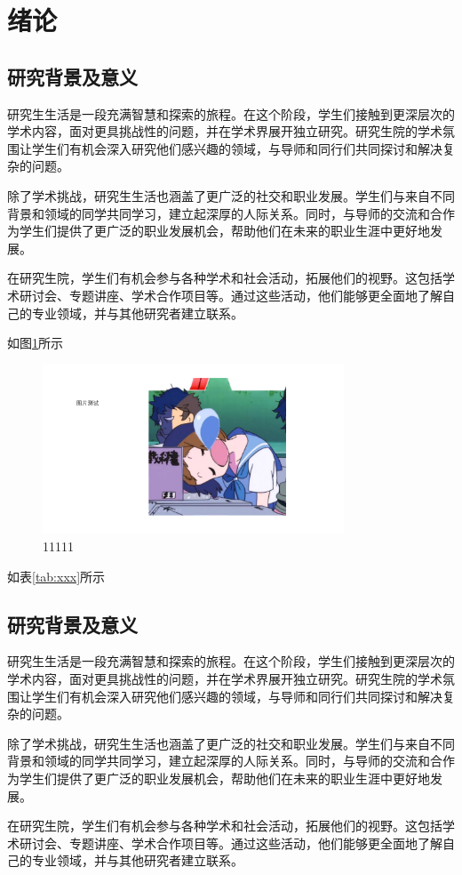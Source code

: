 \clearpage

\section{绪论}

\subsection{研究背景及意义}
研究生生活是一段充满智慧和探索的旅程。在这个阶段，学生们接触到更深层次的学术内容，面对更具挑战性的问题，并在学术界展开独立研究。研究生院的学术氛围让学生们有机会深入研究他们感兴趣的领域，与导师和同行们共同探讨和解决复杂的问题。

除了学术挑战，研究生生活也涵盖了更广泛的社交和职业发展。学生们与来自不同背景和领域的同学共同学习，建立起深厚的人际关系。同时，与导师的交流和合作为学生们提供了更广泛的职业发展机会，帮助他们在未来的职业生涯中更好地发展。

在研究生院，学生们有机会参与各种学术和社会活动，拓展他们的视野。这包括学术研讨会、专题讲座、学术合作项目等。通过这些活动，他们能够更全面地了解自己的专业领域，并与其他研究者建立联系。

如图\ref{fig:w-xxx}所示

 \begin{figure}[h]
    \centering
\includegraphics[width=0.8\textwidth]{figure/cp1/xxx.pdf}
     \caption{11111}  
     \label{fig:w-xxx}
 \end{figure}


如表\ref{tab:xxx}所示



\subsection{研究背景及意义}
研究生生活是一段充满智慧和探索的旅程。在这个阶段，学生们接触到更深层次的学术内容，面对更具挑战性的问题，并在学术界展开独立研究。研究生院的学术氛围让学生们有机会深入研究他们感兴趣的领域，与导师和同行们共同探讨和解决复杂的问题。

除了学术挑战，研究生生活也涵盖了更广泛的社交和职业发展。学生们与来自不同背景和领域的同学共同学习，建立起深厚的人际关系。同时，与导师的交流和合作为学生们提供了更广泛的职业发展机会，帮助他们在未来的职业生涯中更好地发展。

在研究生院，学生们有机会参与各种学术和社会活动，拓展他们的视野。这包括学术研讨会、专题讲座、学术合作项目等。通过这些活动，他们能够更全面地了解自己的专业领域，并与其他研究者建立联系。